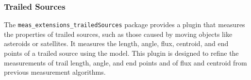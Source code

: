 \subsubsection{Trailed Sources}
\label{sec:trailed-sources}

The \texttt{meas\_extensions\_trailed\-Sources} package provides a plugin that measures the properties of trailed sources, such as those caused by moving objects like asteroids or satellites.
It measures the length, angle, flux, centroid, and end points of a trailed source using the \citet{2012PASP..124.1197V} model.
This plugin is designed to refine the measurements of trail length, angle, and end points and of flux and centroid from previous measurement algorithms.
